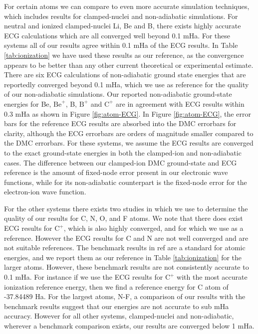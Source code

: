 \documentclass[pra,superscriptaddress,groupedaddress,twocolumn]{revtex4}
\begin{document}
For certain atoms we can compare to even more accurate simulation techniques, which includes results for clamped-nuclei and non-adiabatic simulations.  For neutral and ionized clamped-nuclei Li, Be and B, there exists highly accurate ECG calculations which are all converged well beyond 0.1 mHa.  For these systems all of our results agree within 0.1 mHa of the ECG results.  In Table \ref{tab:ionization} we have used these results as our reference, as the convergence appears to be better than any other current theoretical or experimental estimate.   There are six ECG calculations of non-adiabatic ground state energies that are reportedly converged beyond 0.1 mHa, which we use as reference for the quality of our non-adiabatic simulations. Our reported non-adiabatic ground-state energies for Be, $\text{Be}^+$, B, $\text{B}^+$ and $\text{C}^+$ are in agreement with ECG results within 0.3 mHa as shown in Figure \ref{fig:atom-ECG}. In Figure \ref{fig:atom-ECG}, the error bars for the reference ECG results are absorbed into the DMC errorbars for clarity, although the ECG errorbars are orders of magnitude smaller compared to the DMC errorbars. For these systems, we assume the ECG results are converged to the exact ground-state energies in both the clamped-ion and non-adiabatic cases.  The difference between our clamped-ion DMC ground-state and ECG reference is the amount of fixed-node error present in our electronic wave functions, while for its non-adiabatic counterpart is the fixed-node error for the electron-ion wave function. 

For the other systems there exists two studies in which we use to determine the quality of our results for C, N, O, and F atoms. We note that there does exist ECG results for $\text{C}^+$, which is also highly converged, and for which we use as a reference. However the ECG results for C and N are not well converged and are not suitable references\cite{Bubin_C,Sharkey_N}. The benchmark results in ref \cite{Davidson_Atoms} are a standard for atomic energies, and we report them as our reference in Table \ref{tab:ionization} for the larger atoms.  However, these benchmark results are not consistently accurate to 0.1 mHa. For instance if we use the ECG results for $\text{C}^+$ with the most accurate ionization reference energy, then we find a reference energy for C atom of -37.84489 Ha.   For the largest atoms, N-F, a comparison of our results with the benchmark results suggest that our energies are not accurate to sub mHa accuracy. However for all other systems, clamped-nuclei and non-adiabatic, wherever a benchmark comparison exists, our results are converged below 1 mHa.
\end{document}
